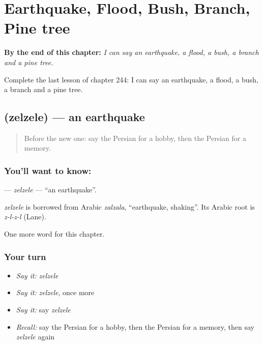 
\chapter{Earthquake, Flood, Bush, Branch, Pine tree}
\label{ch:fa-earthquake-flood-bush-branch-pine-tree}

\begin{chapteropening}
\textbf{By the end of this chapter:} \emph{I can say an earthquake, a flood, a bush, a branch and a pine tree.}

Complete the last lesson of chapter 244: I can say an earthquake, a flood, a bush, a branch and a pine tree.
\end{chapteropening}

\section[\texorpdfstring{\fa{زلزله} (zelzele)}{زلزله (zelzele)}]{ (zelzele) — an earthquake}

\label{lesson:FA-C244-zelzele}



\begin{quote}
Before the new one: say the Persian for a hobby, then the Persian for a memory.
\end{quote}

\subsection*{You'll want to know: }
\textbf{} — \emph{zelzele} — \textquotedblleft{}an earthquake\textquotedblright{}.

\begin{cousinweb}
\emph{zelzele} is borrowed from Arabic \emph{zalzala}, \textquotedblleft{}earthquake, shaking\textquotedblright{}. Its Arabic root is \emph{z-l-z-l} (Lane).
\end{cousinweb}

\begin{grammarlens}[title={What you've built}]
One more word for this chapter.
\end{grammarlens}

\subsection*{Your turn}
\begin{itemize}
\raggedright
  \item \emph{Say it:} \emph{zelzele}
  \item \emph{Say it:} \emph{zelzele}, once more
  \item \emph{Say it:} say \emph{zelzele}
  \item \emph{Recall:} say the Persian for a hobby, then the Persian for a memory, then say \emph{zelzele} again
\end{itemize}

